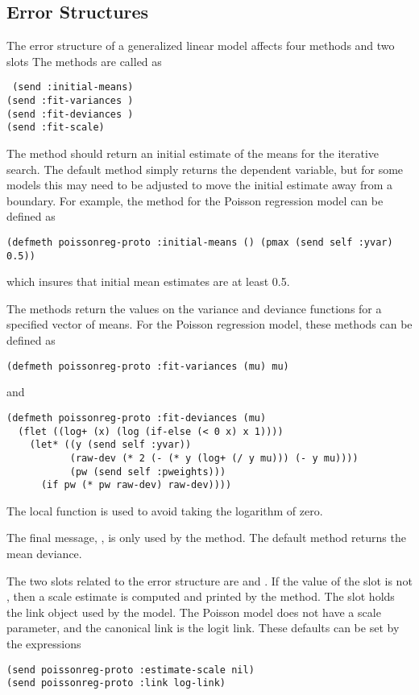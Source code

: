 \subsection{Error Structures}
The error structure of a generalized linear model affects four methods
and two slots The methods are called as
\begin{flushleft}\tt
(send  :initial-means)\\
(send  :fit-variances )\\
(send  :fit-deviances  )\\
(send  :fit-scale)
\end{flushleft}
The  method should return an initial estimate of
the means for the iterative search. The default method simply returns
the dependent variable, but for some models this may need to be
adjusted to move the initial estimate away from a boundary. For
example, the method for the Poisson regression model can be defined as
\begin{verbatim}
(defmeth poissonreg-proto :initial-means () (pmax (send self :yvar) 0.5))
\end{verbatim}
which insures that initial mean estimates are at least 0.5.

The   methods return the
values on the variance and deviance functions for a specified vector
of means. For the Poisson regression model, these methods can be
defined as
\begin{verbatim}
(defmeth poissonreg-proto :fit-variances (mu) mu)
\end{verbatim}
and
\begin{verbatim}
(defmeth poissonreg-proto :fit-deviances (mu)
  (flet ((log+ (x) (log (if-else (< 0 x) x 1))))
    (let* ((y (send self :yvar))
           (raw-dev (* 2 (- (* y (log+ (/ y mu))) (- y mu))))
           (pw (send self :pweights)))
      (if pw (* pw raw-dev) raw-dev))))
\end{verbatim}
The local function  is used to avoid taking the logarithm
of zero.

The final message, , is only used by the
 method. The default method returns the mean deviance.

The two slots related to the error structure are
 and . If the value of the
 slot is not , then a scale estimate
is computed and printed by the  method. The
 slot holds the link object used by the model. The Poisson
model does not have a scale parameter, and the canonical link is the
logit link. These defaults can be set by the expressions
\begin{verbatim}
(send poissonreg-proto :estimate-scale nil)
(send poissonreg-proto :link log-link)
\end{verbatim}

